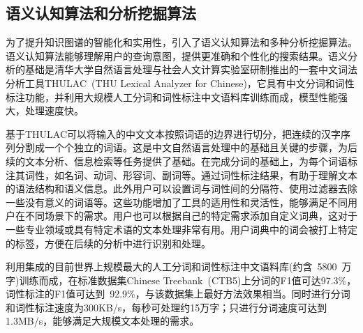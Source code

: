 

\subsection{语义认知算法和分析挖掘算法} 
为了提升知识图谱的智能化和实用性，引入了语义认知算法和多种分析挖掘算法。语义认知算法能够理解用户的查询意图，提供更准确和个性化的搜索结果。语义分析的基础是清华大学自然语言处理与社会人文计算实验室研制推出的一套中文词法分析工具\textrm{THULAC~(THU Lexical Analyzer for Chinese)}，它具有中文分词和词性标注功能，并利用大规模人工分词和词性标注中文语料库训练而成，模型性能强大，处理速度快。

基于\textrm{THULAC}可以将输入的中文文本按照词语的边界进行切分，把连续的汉字序列分割成一个个独立的词语。这是中文自然语言处理中的基础且关键的步骤，为后续的文本分析、信息检索等任务提供了基础。在完成分词的基础上，为每个词语标注其词性，如名词、动词、形容词、副词等。通过词性标注结果，有助于理解文本的语法结构和语义信息。此外用户可以设置词与词性间的分隔符、使用过滤器去除一些没有意义的词语等。这些功能增加了工具的适用性和灵活性，能够满足不同用户在不同场景下的需求。用户也可以根据自己的特定需求添加自定义词典，这对于一些专业领域或具有特定术语的文本处理非常有用。用户词典中的词会被打上特定的标签，方便在后续的分析中进行识别和处理。

利用集成的目前世界上规模最大的人工分词和词性标注中文语料库(约含~5800~万字)训练而成，在标准数据集\textrm{Chinese Treebank~(CTB5)}上分词的\textrm{F1}值可达\textrm{97.3\%}，词性标注的\textrm{F1}值可达到~\textrm{92.9\%}，与该数据集上最好方法效果相当。同时进行分词和词性标注速度为\textrm{300KB/s}，每秒可处理约15万字；只进行分词速度可达到\textrm{1.3MB/s}，能够满足大规模文本处理的需求。

